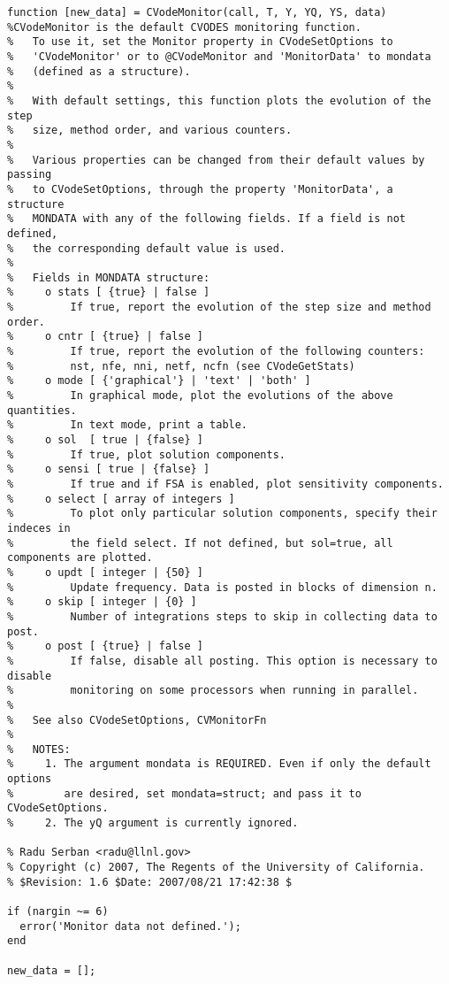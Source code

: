 \begin{lstlisting}[linerange={1-1,45-797}]
function [new_data] = CVodeMonitor(call, T, Y, YQ, YS, data)
%CVodeMonitor is the default CVODES monitoring function.
%   To use it, set the Monitor property in CVodeSetOptions to
%   'CVodeMonitor' or to @CVodeMonitor and 'MonitorData' to mondata
%   (defined as a structure).
%  
%   With default settings, this function plots the evolution of the step 
%   size, method order, and various counters.
%   
%   Various properties can be changed from their default values by passing
%   to CVodeSetOptions, through the property 'MonitorData', a structure
%   MONDATA with any of the following fields. If a field is not defined, 
%   the corresponding default value is used.
%
%   Fields in MONDATA structure:
%     o stats [ {true} | false ]
%         If true, report the evolution of the step size and method order.
%     o cntr [ {true} | false ]
%         If true, report the evolution of the following counters:
%         nst, nfe, nni, netf, ncfn (see CVodeGetStats)
%     o mode [ {'graphical'} | 'text' | 'both' ] 
%         In graphical mode, plot the evolutions of the above quantities.
%         In text mode, print a table.
%     o sol  [ true | {false} ]
%         If true, plot solution components.
%     o sensi [ true | {false} ]
%         If true and if FSA is enabled, plot sensitivity components.
%     o select [ array of integers ]
%         To plot only particular solution components, specify their indeces in
%         the field select. If not defined, but sol=true, all components are plotted.
%     o updt [ integer | {50} ]
%         Update frequency. Data is posted in blocks of dimension n.
%     o skip [ integer | {0} ]
%         Number of integrations steps to skip in collecting data to post.
%     o post [ {true} | false ]
%         If false, disable all posting. This option is necessary to disable
%         monitoring on some processors when running in parallel.
%
%   See also CVodeSetOptions, CVMonitorFn
%
%   NOTES:
%     1. The argument mondata is REQUIRED. Even if only the default options
%        are desired, set mondata=struct; and pass it to CVodeSetOptions.
%     2. The yQ argument is currently ignored.     

% Radu Serban <radu@llnl.gov>
% Copyright (c) 2007, The Regents of the University of California.
% $Revision: 1.6 $Date: 2007/08/21 17:42:38 $

if (nargin ~= 6) 
  error('Monitor data not defined.');
end

new_data = [];


\end{lstlisting}
